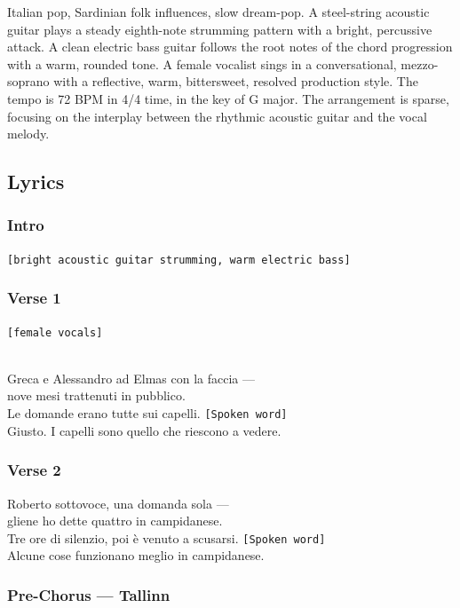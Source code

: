 Italian pop, Sardinian folk influences, slow dream-pop. A steel-string
acoustic guitar plays a steady eighth-note strumming pattern with a
bright, percussive attack. A clean electric bass guitar follows the root
notes of the chord progression with a warm, rounded tone. A female
vocalist sings in a conversational, mezzo-soprano with a reflective,
warm, bittersweet, resolved production style. The tempo is 72 BPM in 4/4
time, in the key of G major. The arrangement is sparse, focusing on the
interplay between the rhythmic acoustic guitar and the vocal melody.

\subsection{Lyrics}\label{lyrics-16}

\subsubsection{Intro}\label{intro}

\texttt{{[}bright\ acoustic\ guitar\ strumming,\ warm\ electric\ bass{]}}

\subsubsection{Verse 1}\label{verse-1-12}

\texttt{{[}female\ vocals{]}}\strut \\
Greca e Alessandro ad Elmas con la faccia ---\\
nove mesi trattenuti in pubblico.\\
Le domande erano tutte sui capelli. \texttt{{[}Spoken\ word{]}}\\
Giusto. I capelli sono quello che riescono a vedere.

\subsubsection{Verse 2}\label{verse-2-12}

Roberto sottovoce, una domanda sola ---\\
gliene ho dette quattro in campidanese.\\
Tre ore di silenzio, poi è venuto a scusarsi.
\texttt{{[}Spoken\ word{]}}\\
Alcune cose funzionano meglio in campidanese.

\subsubsection{Pre-Chorus --- Tallinn}\label{pre-chorus-tallinn}

